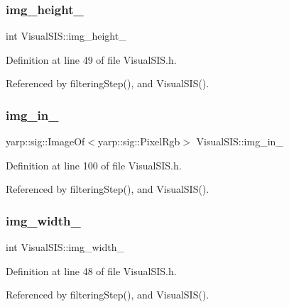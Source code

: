 \subsubsection{\texorpdfstring{img\+\_\+height\+\_\+}{img\_height\_}}
{\footnotesize\ttfamily int Visual\+S\+I\+S\+::img\+\_\+height\+\_\+\hspace{0.3cm}{\ttfamily [protected]}}



Definition at line 49 of file Visual\+S\+I\+S.\+h.



Referenced by filtering\+Step(), and Visual\+S\+I\+S().

\mbox{\label{classVisualSIS_adde5e15abd023e42e940a77e4d096ba5}} 
\subsubsection{\texorpdfstring{img\+\_\+in\+\_\+}{img\_in\_}}
{\footnotesize\ttfamily yarp\+::sig\+::\+Image\+Of$<$yarp\+::sig\+::\+Pixel\+Rgb$>$ Visual\+S\+I\+S\+::img\+\_\+in\+\_\+\hspace{0.3cm}{\ttfamily [private]}}



Definition at line 100 of file Visual\+S\+I\+S.\+h.



Referenced by filtering\+Step(), and Visual\+S\+I\+S().

\mbox{\label{classVisualSIS_a1e168675500d9c8a949e8c2f69be1f5f}} 
\subsubsection{\texorpdfstring{img\+\_\+width\+\_\+}{img\_width\_}}
{\footnotesize\ttfamily int Visual\+S\+I\+S\+::img\+\_\+width\+\_\+\hspace{0.3cm}{\ttfamily [protected]}}



Definition at line 48 of file Visual\+S\+I\+S.\+h.



Referenced by filtering\+Step(), and Visual\+S\+I\+S().


